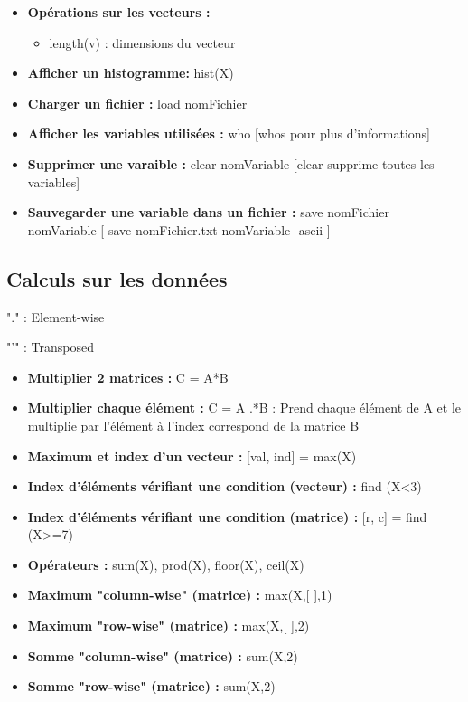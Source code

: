 \documentclass{article}
\theoremstyle{definition}
\begin{document}
\begin{itemize}
\begin{itemize}
	\end{itemize}
	\item \textbf{Opérations sur les vecteurs :}
		\begin{itemize}
			\item length(v) : dimensions du vecteur
		\end{itemize}
	\item \textbf{Afficher un histogramme: } hist(X)
	\item \textbf{Charger un fichier : } load nomFichier
	\item \textbf{Afficher les variables utilisées : } who [whos pour plus d'informations]
	\item \textbf{Supprimer une varaible : } clear nomVariable [clear supprime toutes les variables]
	\item \textbf{Sauvegarder une variable dans un fichier : } save nomFichier nomVariable [ save nomFichier.txt nomVariable -ascii ]	
\end{itemize}
\subsection{Calculs sur les données}
"." : Element-wise \par
"'" : Transposed 
\begin{itemize}
	\item \textbf{Multiplier 2 matrices : } C = A*B
	\item \textbf{Multiplier chaque élément :} C = A .*B : Prend chaque élément de A et le multiplie par l'élément à l'index correspond de la matrice B  
	\item \textbf{Maximum et index d'un vecteur :} [val, ind] = max(X)
	\item \textbf{Index d'éléments vérifiant une condition (vecteur) : } find (X<3)
	\item \textbf{Index d'éléments vérifiant une condition (matrice) : } [r, c] = find (X>=7)
	\item \textbf{Opérateurs : } sum(X), prod(X), floor(X), ceil(X)
	\item \textbf{Maximum "column-wise" (matrice) :} max(X,[ ],1)
	\item \textbf{Maximum "row-wise" (matrice) :} max(X,[ ],2)
	\item \textbf{Somme "column-wise" (matrice) :} sum(X,2)
	\item \textbf{Somme "row-wise" (matrice) :} sum(X,2)
\end{itemize}
\end{document}
